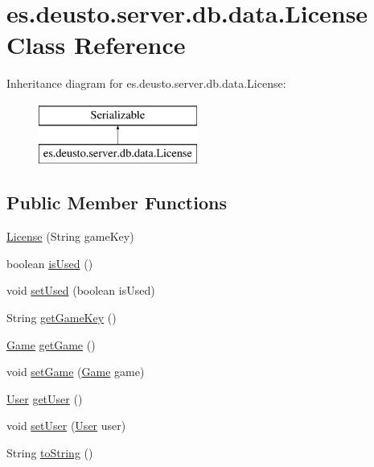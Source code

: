 \hypertarget{classes_1_1deusto_1_1server_1_1db_1_1data_1_1_license}{}\section{es.\+deusto.\+server.\+db.\+data.\+License Class Reference}
\label{classes_1_1deusto_1_1server_1_1db_1_1data_1_1_license}
Inheritance diagram for es.\+deusto.\+server.\+db.\+data.\+License\+:\begin{figure}[H]
\begin{center}
\leavevmode
\includegraphics[height=2.000000cm]{classes_1_1deusto_1_1server_1_1db_1_1data_1_1_license}
\end{center}
\end{figure}
\subsection*{Public Member Functions}
\begin{DoxyCompactItemize}
\item 
\hyperlink{classes_1_1deusto_1_1server_1_1db_1_1data_1_1_license_acc02ae536a7b91b4055271fc93ca8957}{License} (String game\+Key)
\item 
boolean \hyperlink{classes_1_1deusto_1_1server_1_1db_1_1data_1_1_license_aac909623c11f10a457f8b7511145036a}{is\+Used} ()
\item 
void \hyperlink{classes_1_1deusto_1_1server_1_1db_1_1data_1_1_license_aa06731eb1852041fbd788167f6ada563}{set\+Used} (boolean is\+Used)
\item 
String \hyperlink{classes_1_1deusto_1_1server_1_1db_1_1data_1_1_license_a2ca537ce43b9036ccff6626fe70205bc}{get\+Game\+Key} ()
\item 
\hyperlink{classes_1_1deusto_1_1server_1_1db_1_1data_1_1_game}{Game} \hyperlink{classes_1_1deusto_1_1server_1_1db_1_1data_1_1_license_a38c4c66098bc5faa947cd6599fc7f90f}{get\+Game} ()
\item 
void \hyperlink{classes_1_1deusto_1_1server_1_1db_1_1data_1_1_license_ab3173591006e39649097242e4a1045cb}{set\+Game} (\hyperlink{classes_1_1deusto_1_1server_1_1db_1_1data_1_1_game}{Game} game)
\item 
\hyperlink{classes_1_1deusto_1_1server_1_1db_1_1data_1_1_user}{User} \hyperlink{classes_1_1deusto_1_1server_1_1db_1_1data_1_1_license_aa7a9c7a2a5c6b4663746ed3e8ccaf0a1}{get\+User} ()
\item 
void \hyperlink{classes_1_1deusto_1_1server_1_1db_1_1data_1_1_license_a3ca25ef2a8e0d28af263d67f3d41e893}{set\+User} (\hyperlink{classes_1_1deusto_1_1server_1_1db_1_1data_1_1_user}{User} user)
\item 
String \hyperlink{classes_1_1deusto_1_1server_1_1db_1_1data_1_1_license_ae8d930f46f5336bb3478d26ef95c578e}{to\+String} ()
\end{DoxyCompactItemize}


